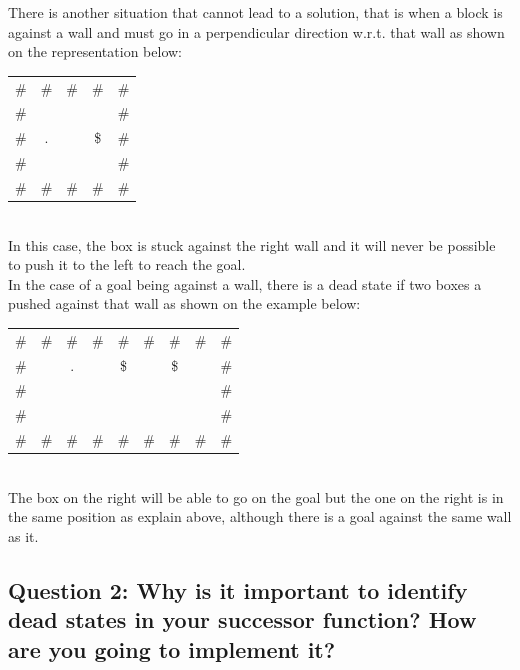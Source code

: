 \documentclass[a4paper,10pt]{article}
\begin{document}
			There is another situation that cannot lead to a solution, that is when a block is against a wall and must go in a perpendicular direction w.r.t. that wall as shown on the representation below: \\
	\begin{tabular}{ccccc}
		\# & \# & \# & \# & \# \\ 
		\# &    &    &    & \# \\ 
		\# & .  &    & \$ & \# \\ 
		\# &    &    &    & \# \\ 
		\# & \# & \# & \# & \# \\ 
	\end{tabular}\\
	In this case, the box is stuck against the right wall and it will never be possible to push it to the left to reach the goal.\\
	In the case of a goal being against a wall, there is a dead state if two boxes a pushed against that wall as shown on the example below: \\
	\begin{tabular}{ccccccccc}
		\# & \# & \# & \# & \# & \# & \# & \# & \# \\ 
		\# &    & .  &    & \$ &    & \$ &    & \# \\ 
		\# &    &    &    &    &    &    &    & \# \\ 
		\# &    &    &    &    &    &    &    & \# \\ 
		\# & \# & \# & \# & \# & \# & \# & \# & \# \\ 
	\end{tabular}\\
	The box on the right will be able to go on the goal but the one on the right is in the same position as explain above, although there is a goal against the same wall as it.
		
		\subsection{Question 2: Why is it important to identify dead states in your successor function? How are you going to implement it?}
			
\end{document}
